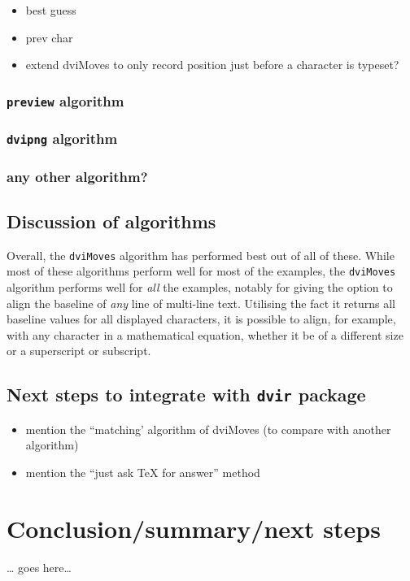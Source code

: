 \documentclass[]{article}
\begin{document}
\begin{itemize}
\item
  best guess
\item
  prev char
\item
  extend dviMoves to only record position just before a character is
  typeset?
\end{itemize}

\subsubsection{\texorpdfstring{\texttt{preview}
algorithm}{preview algorithm}}\label{preview-algorithm}

\subsubsection{\texorpdfstring{\texttt{dvipng}
algorithm}{dvipng algorithm}}\label{dvipng-algorithm}

\subsubsection{any other algorithm?}\label{any-other-algorithm}

\subsection{Discussion of algorithms}\label{discussion-of-algorithms}

Overall, the \texttt{dviMoves} algorithm has performed best out of all
of these. While most of these algorithms perform well for most of the
examples, the \texttt{dviMoves} algorithm performs well for \emph{all}
the examples, notably for giving the option to align the baseline of
\emph{any} line of multi-line text. Utilising the fact it returns all
baseline values for all displayed characters, it is possible to align,
for example, with any character in a mathematical equation, whether it
be of a different size or a superscript or subscript.

\subsection{\texorpdfstring{Next steps to integrate with \texttt{dvir}
package}{Next steps to integrate with dvir package}}\label{next-steps-to-integrate-with-dvir-package}

\begin{itemize}
\item
  mention the ``matching' algorithm of dviMoves (to compare with another
  algorithm)
\item
  mention the ``just ask TeX for answer'' method
\end{itemize}

\newpage{}

\section{Conclusion/summary/next
steps}\label{conclusionsummarynext-steps}

\ldots{} goes here\ldots{}
\end{document}
